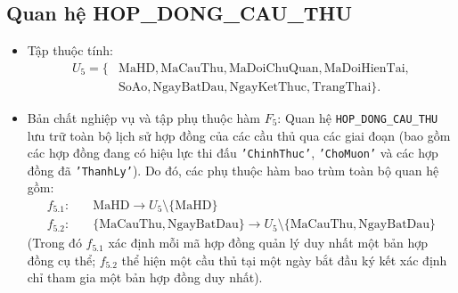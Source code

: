 \subsection{Quan hệ HOP\_DONG\_CAU\_THU}
\begin{itemize}
    \item Tập thuộc tính:
    \begin{align*}
        U_5 = \{&\text{MaHD}, \text{MaCauThu}, \text{MaDoiChuQuan}, \text{MaDoiHienTai}, \\
                &\text{SoAo}, \text{NgayBatDau}, \text{NgayKetThuc}, \text{TrangThai}\}.
    \end{align*}
    \item Bản chất nghiệp vụ và tập phụ thuộc hàm $F_5$:
    Quan hệ \texttt{HOP\_DONG\_CAU\_THU} lưu trữ toàn bộ lịch sử hợp đồng của các cầu thủ qua các giai đoạn (bao gồm các hợp đồng đang có hiệu lực thi đấu \texttt{'ChinhThuc'}, \texttt{'ChoMuon'} và các hợp đồng đã \texttt{'ThanhLy'}). Do đó, các phụ thuộc hàm bao trùm toàn bộ quan hệ gồm:
    \begin{align*}
        f_{5.1}: & \quad \text{MaHD} \rightarrow U_5 \setminus \{\text{MaHD}\} \\
        f_{5.2}: & \quad \{\text{MaCauThu}, \text{NgayBatDau}\} \rightarrow U_5 \setminus \{\text{MaCauThu}, \text{NgayBatDau}\}
    \end{align*}
    (Trong đó $f_{5.1}$ xác định mỗi mã hợp đồng quản lý duy nhất một bản hợp đồng cụ thể; $f_{5.2}$ thể hiện một cầu thủ tại một ngày bắt đầu ký kết xác định chỉ tham gia một bản hợp đồng duy nhất).
    

\end{itemize}
